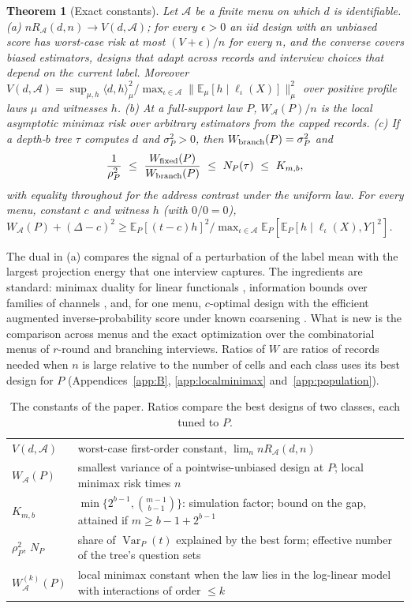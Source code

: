 \documentclass{article}
\newtheorem{theorem}{Theorem}
\newcommand{\E}{\mathbb{E}}
\newcommand{\Var}{\operatorname{Var}}
\newcommand{\A}{\mathcal A}
\begin{document}
\begin{theorem}[Exact constants]\label{thm:char}\label{thm:bracket}
Let $\A$ be a finite menu on which $d$ is identifiable.
\textup{(a)} $nR_\A(d,n)\to V(d,\A)$; for every $\epsilon>0$ an iid design with an unbiased score has worst-case risk at most $(V+\epsilon)/n$ for every $n$, and the converse covers biased estimators, designs that adapt across records and interview choices that depend on the current label. Moreover $V(d,\A)=\sup_{\mu,h}\langle d,h\rangle_\mu^2/\max_{\iota\in\A}\|\E_\mu[h\mid\ell_\iota(X)]\|_\mu^2$ over positive profile laws $\mu$ and witnesses $h$.
\textup{(b)} At a full-support law $P$, $W_\A(P)/n$ is the local asymptotic minimax risk over arbitrary estimators from the capped records.
\textup{(c)} If a depth-$b$ tree $\tau$ computes $d$ and $\sigma_P^2>0$, then $W_{\rm branch}(P)=\sigma_P^2$ and
\[
 \frac1{\rho_P^2}\ \le\ \frac{W_{\rm fixed}(P)}{W_{\rm branch}(P)}\ \le\ N_P(\tau)\ \le\ K_{m,b},
\]
with equality throughout for the address contrast under the uniform law. For every menu, constant $c$ and witness $h$ (with $0/0=0$), $W_\A(P)+(\Delta-c)^2\ge\E_P[(t-c)h]^2/\max_{\iota\in\A}\E_P[\E_P[h\mid\ell_\iota(X),Y]^2]$.
\end{theorem}
The dual in (a) compares the signal of a perturbation of the label mean with the largest projection energy that one interview captures. The ingredients are standard: minimax duality for linear functionals \citep{donoho1994,juditsky2009,polyanskiy2026}, information bounds over families of channels \citep{acharya2019,barnes2020}, and, for one menu, $c$-optimal design with the efficient augmented inverse-probability score under known coarsening \citep{elfving1952,pukelsheim1993,robins1994,tsiatis2006}. What is new is the comparison across menus and the exact optimization over the combinatorial menus of $r$-round and branching interviews. Ratios of $W$ are ratios of records needed when $n$ is large relative to the number of cells and each class uses its best design for $P$ (Appendices~\ref{app:B}, \ref{app:localminimax} and~\ref{app:population}).

\begin{table}[t]
\centering
\caption{The constants of the paper. Ratios compare the best designs of two classes, each tuned to $P$.}
\label{tab:constants}
\footnotesize
\setlength{\tabcolsep}{2.5pt}
\begin{tabular}{lp{6.4cm}}
\toprule
$V(d,\A)$ & worst-case first-order constant, $\lim_n nR_\A(d,n)$\\
$W_\A(P)$ & smallest variance of a pointwise-unbiased design at $P$; local minimax risk times $n$\\
$K_{m,b}$ & $\min\{2^{b-1},\binom{m-1}{b-1}\}$: simulation factor; bound on the gap, attained if $m\ge b-1+2^{b-1}$\\
$\rho_P^2$, $N_P$ & share of $\Var_P(t)$ explained by the best form; effective number of the tree's question sets\\
$W^{(k)}_\A(P)$ & local minimax constant when the law lies in the log-linear model with interactions of order $\le k$\\
\bottomrule
\end{tabular}
\end{table}
\end{document}
